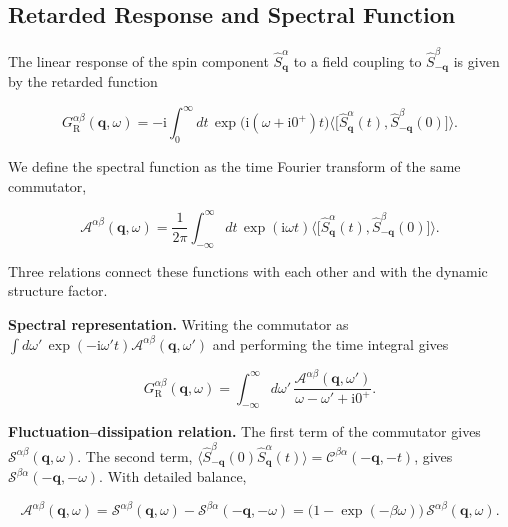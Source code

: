 \subsection{Retarded Response and Spectral Function}

The linear response of the spin component \(\hat S_{\mathbf q}^\alpha\) to a field coupling to \(\hat S_{-\mathbf q}^\beta\) is given by the retarded function

\begin{equation}\label{eq-lswt-retarded-function}
G_{\mathrm R}^{\alpha\beta}(\mathbf q,\omega)
=-\mathrm i\int_0^{\infty}dt\,\exp\!\big(\mathrm i(\omega+\mathrm i0^+)t\big)
\big\langle\big[\hat S_{\mathbf q}^\alpha(t),\hat S_{-\mathbf q}^\beta(0)\big]\big\rangle.
\end{equation}

We define the spectral function as the time Fourier transform of the same commutator,

\begin{equation}\label{eq-lswt-spectral-function}
\mathcal A^{\alpha\beta}(\mathbf q,\omega)
=\frac{1}{2\pi}\int_{-\infty}^{\infty}dt\,\exp(\mathrm i\omega t)
\big\langle\big[\hat S_{\mathbf q}^\alpha(t),\hat S_{-\mathbf q}^\beta(0)\big]\big\rangle.
\end{equation}

Three relations connect these functions with each other and with the dynamic structure factor.

\textbf{Spectral representation.} Writing the commutator as \(\int d\omega'\,\exp(-\mathrm i\omega't)\mathcal A^{\alpha\beta}(\mathbf q,\omega')\) and performing the time integral gives

\[
G_{\mathrm R}^{\alpha\beta}(\mathbf q,\omega)
=\int_{-\infty}^{\infty}d\omega'\,\frac{\mathcal A^{\alpha\beta}(\mathbf q,\omega')}{\omega-\omega'+\mathrm i0^+}.
\]

\textbf{Fluctuation--dissipation relation.} The first term of the commutator gives \(\mathcal S^{\alpha\beta}(\mathbf q,\omega)\). The second term, \(\langle\hat S_{-\mathbf q}^\beta(0)\hat S_{\mathbf q}^\alpha(t)\rangle=\mathcal C^{\beta\alpha}(-\mathbf q,-t)\), gives \(\mathcal S^{\beta\alpha}(-\mathbf q,-\omega)\). With detailed balance,

\begin{equation}\label{eq-lswt-fluctuation-dissipation}
\mathcal A^{\alpha\beta}(\mathbf q,\omega)
=\mathcal S^{\alpha\beta}(\mathbf q,\omega)-\mathcal S^{\beta\alpha}(-\mathbf q,-\omega)
=\big(1-\exp(-\beta\omega)\big)\,\mathcal S^{\alpha\beta}(\mathbf q,\omega).
\end{equation}

